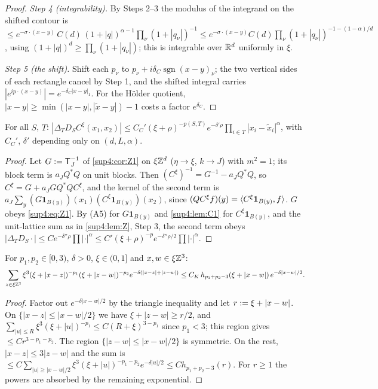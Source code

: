 \begin{proof}
\emph{Step 4 (integrability).} By Steps 2--3 the modulus of the integrand on the shifted contour is $\le e^{-\sigma\cdot(x-y)}\,C(d)\,(1+|q|)^{\alpha-1}\prod_\nu(1+|q_\nu|)^{-1}\le e^{-\sigma\cdot(x-y)}C(d)\prod_\nu(1+|q_\nu|)^{-1-(1-\alpha)/d}$, using $(1+|q|)^d\ge\prod_\nu(1+|q_\nu|)$; this is integrable over $\mathbb R^d$ uniformly in $\xi$.

\emph{Step 5 (the shift).} Shift each $p_\nu$ to $p_\nu+i\delta_C\operatorname{sgn}(x-y)_\nu$; the two vertical sides of each rectangle cancel by Step 1, and the shifted integral carries $|e^{ip\cdot(x-y)}|=e^{-\delta_C|x-y|_1}$. For the H\"older quotient, $|x-y|\ge\min(|x-y|,|\tilde x-y|)-1$ costs a factor $e^{\delta_C}$.
\end{proof}

\begin{lemma}[the free propagator $C^\xi\defeq(-\Delta^\xi+1)^{-1}$ on $\xi\Z^d$, $\xi=L^{-J}$]\label{sup4:lem:C}
For all $S$, $T$: $|\Delta_TD_SC^\xi(x_1,x_2)|\le C_C'(\xi+\rho)^{-p(S,T)}e^{-\delta'\rho}\prod_{i\in T}|x_i-\tilde x_i|^\alpha$, with $C_C'$, $\delta'$ depending only on $(d,L,\alpha)$.
\end{lemma}

\begin{proof}
Let $G:=\mathsf T_J^{-1}$ of \cref{sup4:cor:Z1} on $\xi\Z^d$ ($\eta\to\xi$, $k\to J$) with $m^2=1$; its block term is $a_JQ^*Q$ on unit blocks. Then $(C^\xi)^{-1}=G^{-1}-a_JQ^*Q$, so $C^\xi=G+a_JGQ^*QC^\xi$, and the kernel of the second term is $a_J\sum_y(G\mathbf 1_{B(y)})(x_1)(C^\xi\mathbf 1_{B(y)})(x_2)$, since $(QC^\xi f)(y)=\langle C^\xi\mathbf 1_{B(y)},f\rangle$. $G$ obeys \eqref{sup4:eq:Z1}. By (A5) for $G\mathbf 1_{B(y)}$ and \cref{sup4:lem:C1} for $C^\xi\mathbf 1_{B(y)}$, and the unit-lattice sum as in \cref{sup4:lem:Z}, Step 3, the second term obeys $|\Delta_TD_S\cdot|\le Ce^{-\delta''\rho}\prod|\cdot|^\alpha\le C'(\xi+\rho)^{-p}e^{-\delta''\rho/2}\prod|\cdot|^\alpha$.
\end{proof}

\begin{lemma}[lattice convolution, $d=3$]\label{sup4:lem:K}
For $p_1,p_2\in[0,3)$, $\delta>0$, $\xi\in(0,1]$ and $x,w\in\xi\mathbb Z^3$:
\[
\sum_{z\in\xi\mathbb Z^3}\xi^3(\xi+|x-z|)^{-p_1}(\xi+|z-w|)^{-p_2}e^{-\delta(|x-z|+|z-w|)}\le C_K\,h_{p_1+p_2-3}(\xi+|x-w|)\,e^{-\delta|x-w|/2}.
\]
\end{lemma}

\begin{proof}
Factor out $e^{-\delta|x-w|/2}$ by the triangle inequality and let $r:=\xi+|x-w|$. On $\{|x-z|\le|x-w|/2\}$ we have $\xi+|z-w|\ge r/2$, and $\sum_{|u|\le R}\xi^3(\xi+|u|)^{-p_1}\le C(R+\xi)^{3-p_1}$ since $p_1<3$; this region gives $\le Cr^{3-p_1-p_2}$. The region $\{|z-w|\le|x-w|/2\}$ is symmetric. On the rest, $|x-z|\le3|z-w|$ and the sum is $\le C\sum_{|u|\ge|x-w|/2}\xi^3(\xi+|u|)^{-p_1-p_2}e^{-\delta|u|/2}\le Ch_{p_1+p_2-3}(r)$. For $r\ge1$ the powers are absorbed by the remaining exponential.
\end{proof}

